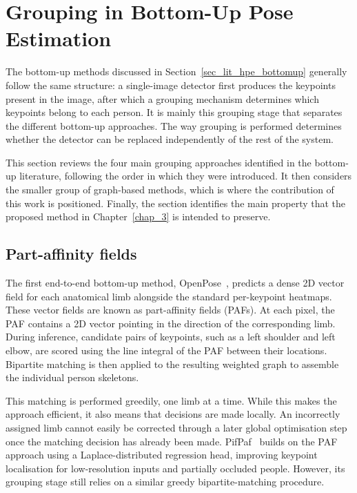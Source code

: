 \section{Grouping in Bottom-Up Pose Estimation}
\label{sec_lit_grouping}

The bottom-up methods discussed in Section~\ref{sec_lit_hpe_bottomup} generally follow the same structure:
a single-image detector first produces the keypoints present in the image,
after which a grouping mechanism determines which keypoints belong to each person.
It is mainly this grouping stage that separates the different bottom-up approaches.
The way grouping is performed determines whether the detector can be replaced independently of the rest of the system.

This section reviews the four main grouping approaches identified in the bottom-up literature,
following the order in which they were introduced.
It then considers the smaller group of graph-based methods,
which is where the contribution of this work is positioned.
Finally, the section identifies the main property
that the proposed method in Chapter~\ref{chap_3} is intended to preserve.


\subsection{Part-affinity fields}
\label{sec_lit_grouping_paf}

The first end-to-end bottom-up method, OpenPose~\cite{cao2017openpose},
predicts a dense 2D vector field for each anatomical limb alongside the standard per-keypoint heatmaps.
These vector fields are known as part-affinity fields (PAFs).
At each pixel, the PAF contains a 2D vector pointing in the direction of the corresponding limb.
During inference, candidate pairs of keypoints, such as a left shoulder and left elbow,
are scored using the line integral of the PAF between their locations.
Bipartite matching is then applied to the resulting weighted graph to assemble the individual person skeletons.

This matching is performed greedily, one limb at a time.
While this makes the approach efficient, it also means that decisions are made locally.
An incorrectly assigned limb cannot easily be corrected through a later global optimisation step
once the matching decision has already been made.
PifPaf~\cite{kreiss2019pifpaf} builds on the PAF approach using a Laplace-distributed regression head,
improving keypoint localisation for low-resolution inputs and partially occluded people.
However, its grouping stage still relies on a similar greedy bipartite-matching procedure.

